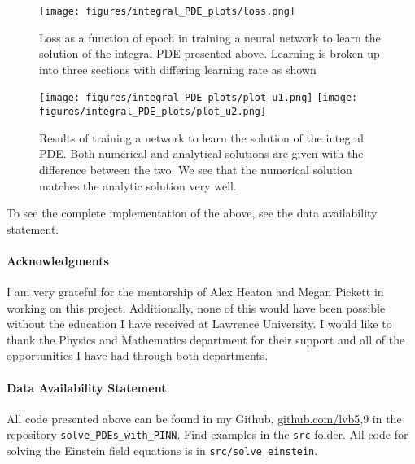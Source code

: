 \documentclass{CUP-JNL-DTM}%
\theoremstyle{definition}
\numberwithin{equation}{section}
\begin{document}
\begin{figure}
\centering
    \texttt{[image: figures/integral\_PDE\_plots/loss.png]}
    \caption{Loss as a function of epoch in training a neural network to learn the solution of the integral PDE presented above. Learning is broken up into three sections with differing learning rate as shown}
    \label{fig:loss_integro}
\end{figure}

\begin{figure}
\centering
    \texttt{[image: figures/integral\_PDE\_plots/plot\_u1.png]}
    \texttt{[image: figures/integral\_PDE\_plots/plot\_u2.png]}
    \caption{Results of training a network to learn the solution of the integral PDE. Both numerical and analytical solutions are given with the difference between the two. We see that the numerical solution matches the analytic solution very well.}
    \label{fig:integro_results}
\end{figure}

To see the complete implementation of the above, see the data availability statement. 


\begin{Backmatter}

\paragraph{Acknowledgments}

I am very grateful for the mentorship of Alex Heaton and Megan Pickett in working on this project. Additionally, none of this would have been possible without the education I have received at Lawrence University. I would like to thank the Physics and Mathematics department for their support and all of the opportunities I have had through both departments. 

\paragraph{Data Availability Statement} All code presented above can be found in my Github, \href{https://github.com/lvb5/solve\_PDEs\_with\_PINN}{github.com/lvb5},9 in the repository \texttt{solve\_PDEs\_with\_PINN}. Find examples in the \texttt{src} folder. All code for solving the Einstein field equations is in \texttt{src/solve\_einstein}.  




\end{Backmatter}
\end{document}
